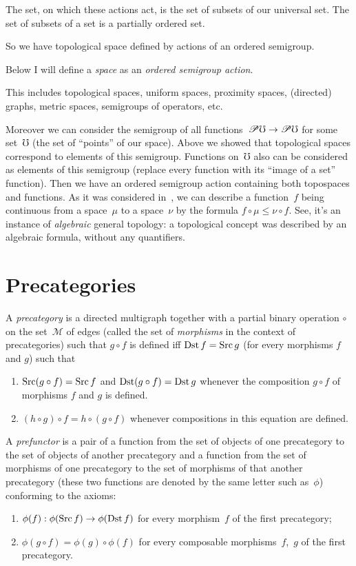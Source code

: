 The set, on which these actions act, is the set of subsets of our universal set. The set of subsets of a set is a partially ordered set.

So we have topological space defined by actions of an ordered semigroup.

Below I will define a \emph{space} as an \emph{ordered semigroup action}.

This includes topological spaces, uniform spaces, proximity spaces, (directed) graphs, metric spaces, semigroups of operators, etc.

Moreover we can consider the semigroup of all functions~$\mathscr{P}\mho\to\mathscr{P}\mho$ for some set~$\mho$ (the set of ``points'' of our space). Above we showed that topological spaces correspond to elements of this semigroup. Functions on~$\mho$ also can be considered as elements of this semigroup (replace every function with its ``image of a set'' function). Then we have an ordered semigroup action containing both topospaces and functions. As it was considered in~\cite{volume-1}, we can describe a function~$f$ being continuous from a space~$\mu$ to a space~$\nu$ by the formula $f\circ\mu\leq\nu\circ f$. See, it's an instance of \emph{algebraic} general topology: a topological concept was described by an algebraic formula, without any quantifiers.

\chapter{Precategories}

\begin{defn}
A \emph{precategory} is a directed multigraph
together with a partial binary operation $\circ$ on the set~$\mathcal{M}$ of edges (called the set of \emph{morphisms} in the context of precategories)
such that $g\circ f$ is defined iff $\operatorname{Dst} f=\operatorname{Src} g$ (for every morphisms
$f$ and $g$) such that
\begin{enumerate}
\item $\operatorname{Src}(g\circ f)=\operatorname{Src} f$ and $\operatorname{Dst}(g\circ f)=\operatorname{Dst} g$ whenever the
composition $g\circ f$ of morphisms $f$ and $g$ is defined.
\item $(h\circ g)\circ f=h\circ(g\circ f)$ whenever compositions in this
equation are defined.
\end{enumerate}
\end{defn}

\begin{defn}
A \emph{prefunctor} is a pair of a function from the set of objects of one precategory to the set of objects of another precategory and a function from the set of morphisms of one precategory to the set of morphisms of that another precategory (these two functions are denoted by the same letter such as~$\phi$) conforming to the axioms:
\begin{enumerate}
\item $\phi(f): \phi(\operatorname{Src} f)\to\phi(\operatorname{Dst} f)$ for every morphism~$f$ of the first precategory;
\item $\phi(g\circ f)=\phi(g)\circ\phi(f)$ for every composable morphisms~$f$,~$g$ of the first precategory.
\end{enumerate}
\end{defn}

